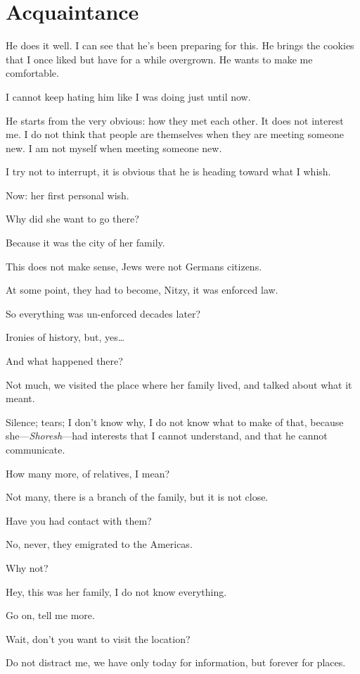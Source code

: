 \chapter*{Acquaintance}\label{acquaintance}

He does it well. I can see that he's been preparing for this. He brings the cookies that I once liked but have for a while overgrown. He wants to make me comfortable. 

I cannot keep hating him like I was doing just until now.

He starts from the very obvious: how they met each other. It does not interest me. I do not think that people are themselves when they are meeting someone new. I am not myself when meeting someone new.

I try not to interrupt, it is obvious that he is heading toward what I whish. 

Now: her first personal wish. 

Why did she want to go there?

Because it was the city of her family. 

This does not make sense, Jews were not Germans citizens.

At some point, they had to become, Nitzy, it was enforced law.

So everything was un-enforced decades later?

Ironies of history, but, yes\dots

And what happened there?

Not much, we visited the place where her family lived, and talked about what it meant.

Silence; tears; I don't know why, I do not know what to make of that, because she---\emph{Shoresh}---had interests that I cannot understand, and that he cannot communicate.

How many more, of relatives, I mean?

Not many, there is a branch of the family, but it is not close.

Have you had contact with them?

No, never, they emigrated to the Americas.

Why not?

Hey, this was her family, I do not know everything.

Go on, tell me more.

Wait, don't you want to visit the location?

Do not distract me, we have only today for information, but forever for places. 


